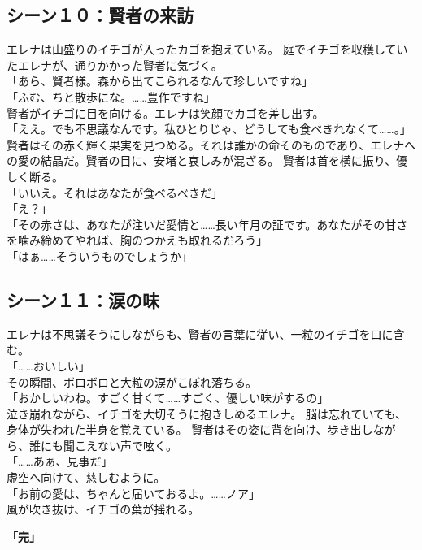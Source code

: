 \subsection{シーン１０：賢者の来訪}
エレナは山盛りのイチゴが入ったカゴを抱えている。
庭でイチゴを収穫していたエレナが、通りかかった賢者に気づく。
\\「あら、賢者様。森から出てこられるなんて珍しいですね」
\\「ふむ、ちと散歩にな。……豊作ですね」\\
賢者がイチゴに目を向ける。エレナは笑顔でカゴを差し出す。
\\「ええ。でも不思議なんです。私ひとりじゃ、どうしても食べきれなくて……。」\\
賢者はその赤く輝く果実を見つめる。それは誰かの命そのものであり、エレナへの愛の結晶だ。賢者の目に、安堵と哀しみが混ざる。
賢者は首を横に振り、優しく断る。
\\「いいえ。それはあなたが食べるべきだ」
\\「え？」
\\「その赤さは、あなたが注いだ愛情と……長い年月の証です。あなたがその甘さを噛み締めてやれば、胸のつかえも取れるだろう」
\\「はぁ……そういうものでしょうか」

\subsection{シーン１１：涙の味}
エレナは不思議そうにしながらも、賢者の言葉に従い、一粒のイチゴを口に含む。
\\「……おいしい」\\
その瞬間、ボロボロと大粒の涙がこぼれ落ちる。
\\「おかしいわね。すごく甘くて……すごく、優しい味がするの」\\
泣き崩れながら、イチゴを大切そうに抱きしめるエレナ。
脳は忘れていても、身体が失われた半身を覚えている。
賢者はその姿に背を向け、歩き出しながら、誰にも聞こえない声で呟く。
\\「……あぁ、見事だ」\\
虚空へ向けて、慈しむように。
\\「お前の愛は、ちゃんと届いておるよ。……ノア」\\
風が吹き抜け、イチゴの葉が揺れる。%

\textbf{「完」}



